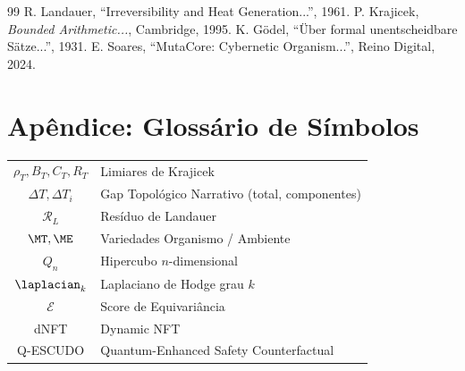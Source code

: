 \documentclass[11pt,a4paper]{article}
\newcommand{\rhoT}{\rho_T}
\newcommand{\BT}{B_T}
\newcommand{\CT}{C_T}
\newcommand{\RT}{R_T}
\newcommand{\DeltaT}{\Delta T}
\newcommand{\RL}{\mathcal{R}_L}
\begin{document}

\begin{thebibliography}{99}
 R. Landauer, ``Irreversibility and Heat Generation...'', 1961.
 P. Krajicek, \textit{Bounded Arithmetic...}, Cambridge, 1995.
 K. Gödel, ``Über formal unentscheidbare Sätze...'', 1931.
 E. Soares, ``MutaCore: Cybernetic Organism...'', Reino Digital, 2024.
\end{thebibliography}

\appendix
\section{Apêndice: Glossário de Símbolos}
\begin{tabular}{@{}cl@{}}
\toprule
$\rhoT, \BT, \CT, \RT$ & Limiares de Krajicek \\
$\DeltaT, \DeltaT_i$ & Gap Topológico Narrativo (total, componentes) \\
$\RL$ & Resíduo de Landauer \\
$\MT, \ME$ & Variedades Organismo / Ambiente \\
$Q_n$ & Hipercubo $n$-dimensional \\
$\laplacian_k$ & Laplaciano de Hodge grau $k$ \\
$\mathcal{E}$ & Score de Equivariância \\
dNFT & Dynamic NFT \\
Q-ESCUDO & Quantum-Enhanced Safety Counterfactual \\
\bottomrule
\end{tabular}
\end{document}
